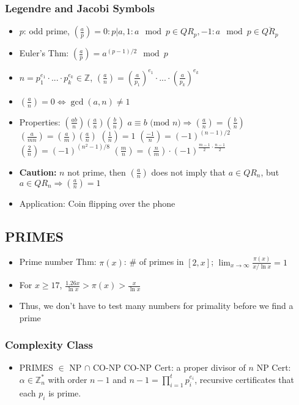 \documentclass[12pt]{article}
\newcommand{\Z}{\mathbb{Z}}
\newcommand{\I}{\Rightarrow}
\newcommand{\modd}[1]{\text{ (mod } #1\text{)}}
\newcommand{\jac}[2]{\left( \frac{#1}{#2} \right)}
\begin{document}
\subsubsection{Legendre and Jacobi Symbols}

\begin{itemize}
\item $p$: odd prime, $\jac{a}{p} = 0: p|a, 1: a\mod p \in QR_p, -1: a\mod p \in \overline{QR_p}$
\item Euler's Thm: $\jac{a}{p} = a^{(p-1)/2} \mod p$
\item $n = p_1^{e_1}\cdot ... \cdot p_k^{e_k} \in \Z$, $\jac{a}{n} = \jac{a}{p_1}^{e_1}\cdot ... \cdot \jac{a}{p_k}^{e_k}$
\item $\jac{a}{n} = 0 \iff \gcd(a,n) \ne 1$
\item Properties:
\subitem $\jac{ab}{n} \jac{a}{n}\jac{b}{n}$
\subitem $a \equiv b \modd n \I \jac{a}{n} = \jac{b}{n}$
\subitem $\jac{a}{mn} = \jac{a}{m}\jac{a}{n}$
\subitem $\jac{1}{n} = 1$
\subitem $\jac{-1}{n} = (-1)^{(n-1)/2}$
\subitem $\jac{2}{n} = (-1)^{(n^2-1)/8}$
\subitem $\jac{m}{n} = \jac{n}{m} \cdot (-1)^{\frac{m-1}{2}\cdot\frac{n-1}{2}}$
\item \textbf{Caution:} $n$ not prime, then $\jac{a}{n}$ does not imply that $a \in QR_n$, but $a \in QR_n \I \jac{a}{n} = 1$
\item Application: Coin flipping over the phone
\end{itemize}

\subsection{PRIMES}

\begin{itemize}
\item Prime number Thm: $\pi(x)$: \# of primes in $[2,x]$; $\lim_{x\to\infty} \frac{\pi(x)}{x/\ln x} = 1$
\item For $x \ge 17$, $\frac{1.26x}{\ln x} > \pi(x) > \frac{x}{\ln x}$
\item Thus, we don't have to test many numbers for primality before we find a prime
\end{itemize}

\subsubsection{Complexity Class}

\begin{itemize}
\item PRIMES $\in$ NP $\cap$ CO-NP
\subitem CO-NP Cert: a proper divisor of $n$
\subitem NP Cert: $\alpha \in \Z_n^*$ with order $n-1$ and $n-1 = \prod_{i=1}^{t} p_i^{e_i}$, recursive certificates that each $p_i$ is prime.
\end{itemize}
\end{document}

